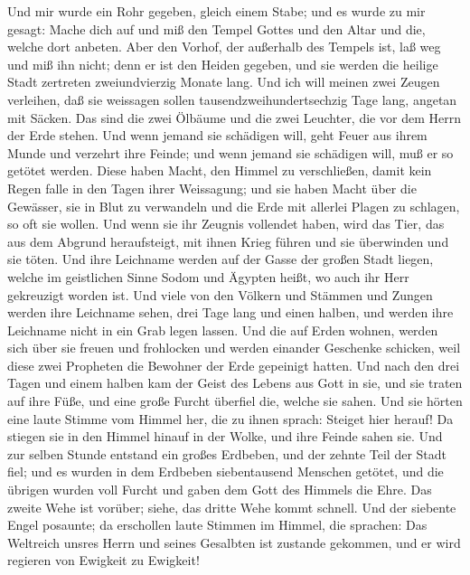  Und mir wurde ein Rohr gegeben, gleich einem Stabe; und
es wurde zu mir gesagt: Mache dich auf und miß den Tempel Gottes und den
Altar und die, welche dort anbeten.  Aber den Vorhof, der
außerhalb des Tempels ist, laß weg und miß ihn nicht; denn er ist den
Heiden gegeben, und sie werden die heilige Stadt zertreten
zweiundvierzig Monate lang.  Und ich will meinen zwei
Zeugen verleihen, daß sie weissagen sollen tausendzweihundertsechzig
Tage lang, angetan mit Säcken.  Das sind die zwei Ölbäume
und die zwei Leuchter, die vor dem Herrn der Erde stehen. 
Und wenn jemand sie schädigen will, geht Feuer aus ihrem Munde und
verzehrt ihre Feinde; und wenn jemand sie schädigen will, muß er so
getötet werden.  Diese haben Macht, den Himmel zu
verschließen, damit kein Regen falle in den Tagen ihrer Weissagung; und
sie haben Macht über die Gewässer, sie in Blut zu verwandeln und die
Erde mit allerlei Plagen zu schlagen, so oft sie wollen. 
Und wenn sie ihr Zeugnis vollendet haben, wird das Tier, das aus dem
Abgrund heraufsteigt, mit ihnen Krieg führen und sie überwinden und sie
töten.  Und ihre Leichname werden auf der Gasse der großen
Stadt liegen, welche im geistlichen Sinne Sodom und Ägypten heißt, wo
auch ihr Herr gekreuzigt worden ist.  Und viele von den
Völkern und Stämmen und Zungen werden ihre Leichname sehen, drei Tage
lang und einen halben, und werden ihre Leichname nicht in ein Grab legen
lassen.  Und die auf Erden wohnen, werden sich über sie
freuen und frohlocken und werden einander Geschenke schicken, weil diese
zwei Propheten die Bewohner der Erde gepeinigt hatten. 
Und nach den drei Tagen und einem halben kam der Geist des Lebens aus
Gott in sie, und sie traten auf ihre Füße, und eine große Furcht
überfiel die, welche sie sahen.  Und sie hörten eine
laute Stimme vom Himmel her, die zu ihnen sprach: Steiget hier herauf!
Da stiegen sie in den Himmel hinauf in der Wolke, und ihre Feinde sahen
sie.  Und zur selben Stunde entstand ein großes Erdbeben,
und der zehnte Teil der Stadt fiel; und es wurden in dem Erdbeben
siebentausend Menschen getötet, und die übrigen wurden voll Furcht und
gaben dem Gott des Himmels die Ehre.  Das zweite Wehe ist
vorüber; siehe, das dritte Wehe kommt schnell.  Und der
siebente Engel posaunte; da erschollen laute Stimmen im Himmel, die
sprachen: Das Weltreich unsres Herrn und seines Gesalbten ist zustande
gekommen, und er wird regieren von Ewigkeit zu Ewigkeit! 
